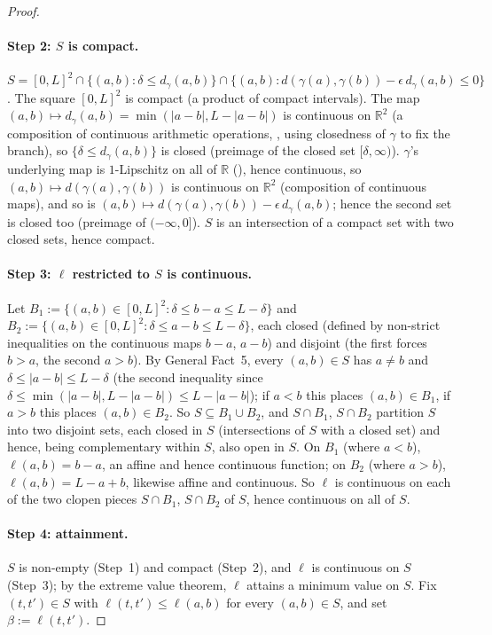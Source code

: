 \begin{proof}
  \paragraph{Step 2: $S$ is compact.} $S = [0,L]^2 \cap \{(a,b) : \delta \le d_\gamma(a,b)\} \cap
  \{(a,b) : d(\gamma(a),\gamma(b)) - \epsilon\, d_\gamma(a,b) \le 0\}$. The square $[0,L]^2$ is
  compact (a product of compact intervals). The map $(a,b) \mapsto d_\gamma(a,b) =
  \min(|a-b|,L-|a-b|)$ is continuous on $\mathbb{R}^2$ (a composition of continuous arithmetic
  operations, , using closedness of $\gamma$ to fix the branch), so $\{\delta \le
  d_\gamma(a,b)\}$ is closed (preimage of the closed set $[\delta,\infty)$). $\gamma$'s underlying
  map is $1$-Lipschitz on all of $\mathbb{R}$ (), hence continuous, so
  $(a,b) \mapsto d(\gamma(a),\gamma(b))$ is continuous on $\mathbb{R}^2$ (composition of continuous
  maps), and so is $(a,b)\mapsto d(\gamma(a),\gamma(b))-\epsilon\, d_\gamma(a,b)$; hence the second
  set is closed too (preimage of $(-\infty,0]$). $S$ is an intersection of a compact set with two
  closed sets, hence compact.

  \paragraph{Step 3: $\ell$ restricted to $S$ is continuous.} Let $B_1 := \{(a,b)\in[0,L]^2 :
  \delta \le b-a \le L-\delta\}$ and $B_2 := \{(a,b)\in[0,L]^2 : \delta \le a-b \le L-\delta\}$,
  each closed (defined by non-strict inequalities on the continuous maps $b-a$, $a-b$) and disjoint
  (the first forces $b>a$, the second $a>b$). By General Fact~5, every $(a,b)\in S$ has $a\ne b$
  and $\delta \le |a-b| \le L-\delta$ (the second inequality since $\delta \le
  \min(|a-b|,L-|a-b|)\le L-|a-b|$); if $a<b$ this places $(a,b)\in B_1$, if $a>b$ this places
  $(a,b)\in B_2$. So $S \subseteq B_1 \cup B_2$, and $S \cap B_1$, $S \cap B_2$ partition $S$ into
  two disjoint sets, each closed in $S$ (intersections of $S$ with a closed set) and hence, being
  complementary within $S$, also open in $S$. On $B_1$ (where $a<b$), $\ell(a,b)=b-a$, an affine and
  hence continuous function; on $B_2$ (where $a>b$), $\ell(a,b) = L-a+b$, likewise affine and
  continuous. So $\ell$ is continuous on each of the two clopen pieces $S\cap B_1$, $S \cap B_2$ of
  $S$, hence continuous on all of $S$.

  \paragraph{Step 4: attainment.} $S$ is non-empty (Step~1) and compact (Step~2), and $\ell$ is
  continuous on $S$ (Step~3); by the extreme value theorem, $\ell$ attains a minimum value on $S$.
  Fix $(t,t')\in S$ with $\ell(t,t') \le \ell(a,b)$ for every $(a,b)\in S$, and set $\beta :=
  \ell(t,t')$.


\end{proof}
